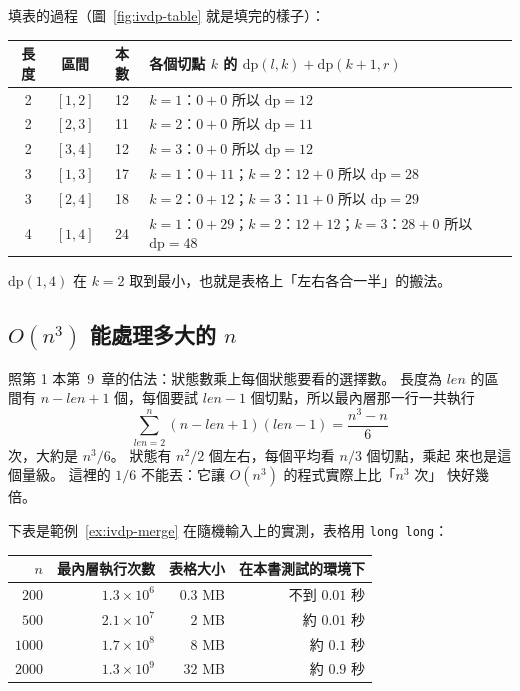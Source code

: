 填表的過程（圖~\ref{fig:ivdp-table} 就是填完的樣子）：

\begin{center}
\begin{tabular}{cccl}
\toprule
長度 & 區間 & 本數 & 各個切點 $k$ 的 $\mathrm{dp}(l, k) + \mathrm{dp}(k + 1, r)$ \\
\midrule
2 & $[1, 2]$ & 12 & $k = 1$：$0 + 0$ \quad 所以 $\mathrm{dp} = 12$ \\
2 & $[2, 3]$ & 11 & $k = 2$：$0 + 0$ \quad 所以 $\mathrm{dp} = 11$ \\
2 & $[3, 4]$ & 12 & $k = 3$：$0 + 0$ \quad 所以 $\mathrm{dp} = 12$ \\
3 & $[1, 3]$ & 17 & $k = 1$：$0 + 11$；$k = 2$：$12 + 0$ \quad 所以 $\mathrm{dp} = 28$ \\
3 & $[2, 4]$ & 18 & $k = 2$：$0 + 12$；$k = 3$：$11 + 0$ \quad 所以 $\mathrm{dp} = 29$ \\
4 & $[1, 4]$ & 24 & $k = 1$：$0 + 29$；$k = 2$：$12 + 12$；$k = 3$：$28 + 0$ \quad 所以 $\mathrm{dp} = 48$ \\
\bottomrule
\end{tabular}
\end{center}

$\mathrm{dp}(1, 4)$ 在 $k = 2$ 取到最小，也就是表格上「左右各合一半」的搬法。

\subsection{$O(n^3)$ 能處理多大的 $n$}
\label{sec:ivdp-cost}

照第 1 本第~9~章的估法：狀態數乘上每個狀態要看的選擇數。 長度為 $len$ 的區間有
$n - len + 1$ 個，每個要試 $len - 1$ 個切點，所以最內層那一行一共執行
\[
\sum_{len = 2}^{n} (n - len + 1)(len - 1) = \frac{n^3 - n}{6}
\]
次，大約是 $n^3 / 6$。 狀態有 $n^2/2$ 個左右，每個平均看 $n/3$ 個切點，乘起
來也是這個量級。 這裡的 $1/6$ 不能丟：它讓 $O(n^3)$ 的程式實際上比「$n^3$ 次」
快好幾倍。

下表是範例~\ref{ex:ivdp-merge} 在隨機輸入上的實測，表格用 \texttt{long long}：

\begin{center}
\begin{tabular}{rrrr}
\toprule
$n$ & 最內層執行次數 & 表格大小 & 在本書測試的環境下 \\
\midrule
$200$ & $1.3 \times 10^{6}$ & $0.3$ MB & 不到 $0.01$ 秒 \\
$500$ & $2.1 \times 10^{7}$ & $2$ MB & 約 $0.01$ 秒 \\
$1000$ & $1.7 \times 10^{8}$ & $8$ MB & 約 $0.1$ 秒 \\
$2000$ & $1.3 \times 10^{9}$ & $32$ MB & 約 $0.9$ 秒 \\
\bottomrule
\end{tabular}
\end{center}

